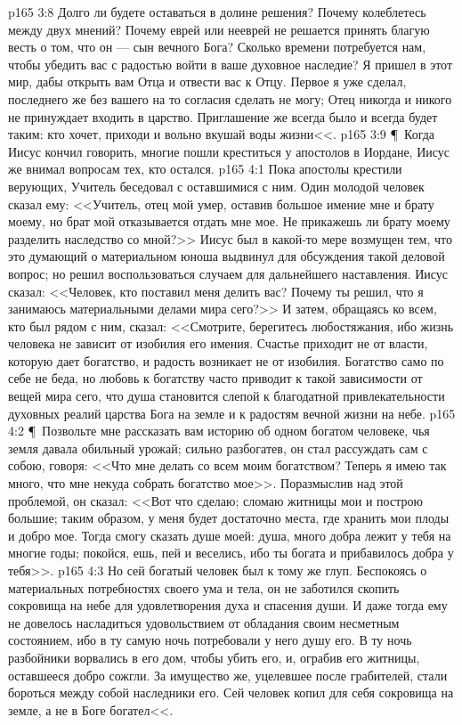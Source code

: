\vs p165 3:8 Долго ли будете оставаться в долине решения? Почему колеблетесь между двух мнений? Почему еврей или нееврей не решается принять благую весть о том, что он --- сын вечного Бога? Сколько времени потребуется нам, чтобы убедить вас с радостью войти в ваше духовное наследие? Я пришел в этот мир, дабы открыть вам Отца и отвести вас к Отцу. Первое я уже сделал, последнего же без вашего на то согласия сделать не могу; Отец никогда и никого не принуждает входить в царство. Приглашение же всегда было и всегда будет таким: кто хочет, приходи и вольно вкушай воды жизни<<.
\vs p165 3:9 \P\ Когда Иисус кончил говорить, многие пошли креститься у апостолов в Иордане, Иисус же внимал вопросам тех, кто остался.
\vs p165 4:1 Пока апостолы крестили верующих, Учитель беседовал с оставшимися с ним. Один молодой человек сказал ему: <<Учитель, отец мой умер, оставив большое имение мне и брату моему, но брат мой отказывается отдать мне мое. Не прикажешь ли брату моему разделить наследство со мной?>> Иисус был в какой\hyp{}то мере возмущен тем, что это думающий о материальном юноша выдвинул для обсуждения такой деловой вопрос; но решил воспользоваться случаем для дальнейшего наставления. Иисус сказал: <<Человек, кто поставил меня делить вас? Почему ты решил, что я занимаюсь материальными делами мира сего?>> И затем, обращаясь ко всем, кто был рядом с ним, сказал: <<Смотрите, берегитесь любостяжания, ибо жизнь человека не зависит от изобилия его имения. Счастье приходит не от власти, которую дает богатство, и радость возникает не от изобилия. Богатство само по себе не беда, но любовь к богатству часто приводит к такой зависимости от вещей мира сего, что душа становится слепой к благодатной привлекательности духовных реалий царства Бога на земле и к радостям вечной жизни на небе.
\vs p165 4:2 \P\ Позвольте мне рассказать вам историю об одном богатом человеке, чья земля давала обильный урожай; сильно разбогатев, он стал рассуждать сам с собою, говоря: <<Что мне делать со всем моим богатством? Теперь я имею так много, что мне некуда собрать богатство мое>>. Поразмыслив над этой проблемой, он сказал: <<Вот что сделаю; сломаю житницы мои и построю большие; таким образом, у меня будет достаточно места, где хранить мои плоды и добро мое. Тогда смогу сказать душе моей: душа, много добра лежит у тебя на многие годы; покойся, ешь, пей и веселись, ибо ты богата и прибавилось добра у тебя>>.
\vs p165 4:3 Но сей богатый человек был к тому же глуп. Беспокоясь о материальных потребностях своего ума и тела, он не заботился скопить сокровища на небе для удовлетворения духа и спасения души. И даже тогда ему не довелось насладиться удовольствием от обладания своим несметным состоянием, ибо в ту самую ночь потребовали у него душу его. В ту ночь разбойники ворвались в его дом, чтобы убить его, и, ограбив его житницы, оставшееся добро сожгли. За имущество же, уцелевшее после грабителей, стали бороться между собой наследники его. Сей человек копил для себя сокровища на земле, а не в Боге богател<<.
